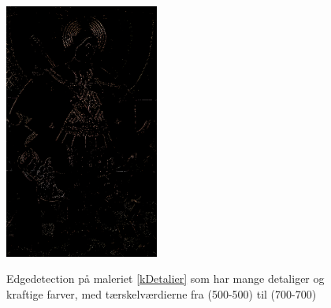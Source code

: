 \begin{figure}[!h]
{        \includegraphics[angle=0,width=0.45\textwidth]{afsnit/afprovning/billeder/thressholds/krafitige_farver/krafite_detalier/1_iteration/700-700.png}
        \label{700-700}}\hspace{1em}
    \caption[]{Edgedetection på maleriet \ref{kDetalier} som har mange detaliger og kraftige farver, med tærskelværdierne fra (500-500) til (700-700)}
     \label{allesammen2}
\end{figure}

